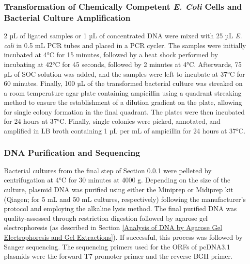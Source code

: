 \subsubsection[Transformation of \textit{E. Coli} and Bacterial Culture]{Transformation of Chemically Competent \textit{E. Coli} Cells and Bacterial Culture Amplification} \label{Transformation of Chemically Competent E.Coli Cells and Bacterial Culture Amplification}
2 µL of ligated samples or 1 µL of concentrated DNA were mixed with 25 µL \textit{E. coli} in 0.5 mL PCR tubes and placed in a PCR cycler. The samples were initially incubated at 4°C for 15 minutes, followed by a heat shock performed by incubating at 42°C for 45 seconds, followed by 2 minutes at 4°C. Afterwards, 75 µL of SOC solution was added, and the samples were left to incubate at 37°C for 60 minutes. Finally, 100 µL of the transformed bacterial culture was streaked on a room temperature agar plate containing ampicillin using a quadrant streaking method to ensure the establishment of a dilution gradient on the plate, allowing for single colony formation in the final quadrant. The plates were then incubated for 24 hours at 37°C. Finally, single colonies were picked, annotated, and amplified in LB broth containing 1 µL per mL of ampicillin for 24 hours at 37°C.

\subsubsection{DNA Purification and Sequencing} \label{DNA Purification and Sequencing}
Bacterial cultures from the final step of Section \ref{Transformation of Chemically Competent E.Coli Cells and Bacterial Culture Amplification} were pelleted by centrifugation at 4°C for 30 minutes at 4000 g. Depending on the size of the culture, plasmid DNA was purified using either the Miniprep or Midiprep kit (Qiagen; for 5 mL and 50 mL cultures, respectively) following the manufacturer's protocol and employing the alkaline lysis method. The final purified DNA was quality-assessed through restriction digestion followed by agarose gel electrophoresis (as described in Section \ref{Analysis of DNA by Agarose Gel Electrophoresis and Gel Extractions}). If successful, this process was followed by Sanger sequencing. The sequencing primers used for the ORFs of pcDNA3.1 plasmids were the forward T7 promoter primer and the reverse BGH primer.

